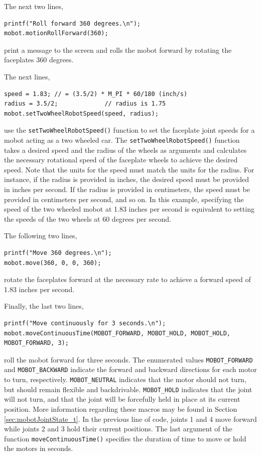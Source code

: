 \documentclass{article}
\begin{document}
The next two lines,
\begin{verbatim}
printf("Roll forward 360 degrees.\n");
mobot.motionRollForward(360);
\end{verbatim}
print a message to the screen and rolls the mobot forward by rotating the faceplates
360 degrees.

The next lines,
\begin{verbatim}
speed = 1.83; // = (3.5/2) * M_PI * 60/180 (inch/s)
radius = 3.5/2;             // radius is 1.75 
mobot.setTwoWheelRobotSpeed(speed, radius);
\end{verbatim}
use the \texttt{setTwoWheelRobotSpeed()} function to set the faceplate joint
speeds for a mobot acting as a two wheeled car. The
\texttt{setTwoWheelRobotSpeed()} function takes a desired speed
and the radius of the wheels as arguments and calculates the necessary
rotational speed of the faceplate wheels to achieve the desired speed. Note
that the units for the speed must match the units for the radius. For instance,
if the radius is provided in inches, the desired speed must be provided in 
inches per second. If the radius is provided in centimeters, the speed must
be provided in centimeters per second, and so on. In this example, specifying 
the speed of the two wheeled mobot at 1.83 inches per second is equivalent to setting
the speeds of the two wheels at 60 degrees per second.

The following two lines,
\begin{verbatim}
printf("Move 360 degrees.\n");
mobot.move(360, 0, 0, 360);
\end{verbatim}
rotate the faceplates forward at the necessary rate to achieve a forward speed of
1.83 inches per second.

Finally, the last two lines,
\begin{verbatim}
printf("Move continuously for 3 seconds.\n");
mobot.moveContinuousTime(MOBOT_FORWARD, MOBOT_HOLD, MOBOT_HOLD, MOBOT_FORWARD, 3);
\end{verbatim}
roll the mobot forward for three seconds.
The enumerated values \texttt{MOBOT\_FORWARD} and \texttt{MOBOT\_BACKWARD}
indicate the forward and backward directions for each motor to turn, respectively. 
\texttt{MOBOT\_NEUTRAL} indicates that the motor should not turn, but
should remain flexible and backdrivable. \texttt{MOBOT\_HOLD}
indicates that the joint will not turn, and that the joint will be 
forcefully held in place at its current position. More information regarding these
macros may be found in Section \ref{sec:mobotJointState_t}. In the previous
line of code, joints 1 and 4 
move forward while joints 2 and 3 hold their current positions. The
last argument  of the function \texttt{moveContinuousTime()} specifies the
duration of time to move or hold the motors in seconds.
\end{document}
